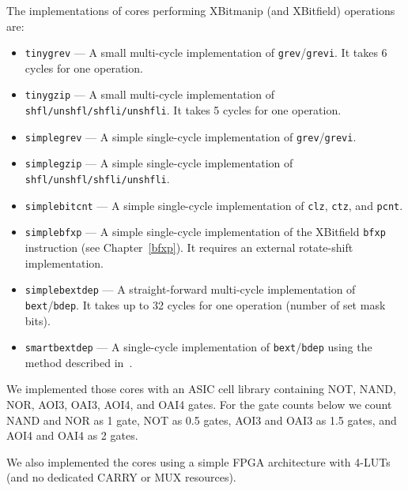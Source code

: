 The implementations of cores performing XBitmanip (and XBitfield) operations are:

\begin{itemize}
\item {\tt tinygrev} --- A small multi-cycle implementation of {\tt grev}/{\tt grevi}.
It takes 6 cycles for one operation.
\item {\tt tinygzip} --- A small multi-cycle implementation of {\tt shfl/unshfl/shfli/unshfli}.
It takes 5 cycles for one operation.
\item {\tt simplegrev} --- A simple single-cycle implementation of {\tt grev}/{\tt grevi}.
\item {\tt simplegzip} --- A simple single-cycle implementation of {\tt shfl/unshfl/shfli/unshfli}.
\item {\tt simplebitcnt} --- A simple single-cycle implementation of {\tt clz}, {\tt ctz}, and {\tt pcnt}.
\item {\tt simplebfxp} --- A simple single-cycle implementation of the XBitfield {\tt bfxp}
instruction (see Chapter~\ref{bfxp}). It requires an external rotate-shift implementation.
\item {\tt simplebextdep} --- A straight-forward multi-cycle implementation of {\tt bext}/{\tt bdep}.
It takes up to 32 cycles for one operation (number of set mask bits).
\item {\tt smartbextdep} --- A single-cycle implementation of {\tt bext}/{\tt bdep}
using the method described in~\cite{Hilewitz06}.
\end{itemize}

We implemented those cores with an ASIC cell library containing NOT, NAND, NOR,
AOI3, OAI3, AOI4, and OAI4 gates. For the gate counts below we count NAND and NOR
as 1 gate, NOT as 0.5 gates, AOI3 and OAI3 as 1.5 gates, and AOI4 and OAI4 as 2 gates.

We also implemented the cores using a simple FPGA architecture with 4-LUTs (and no
dedicated CARRY or MUX resources).

